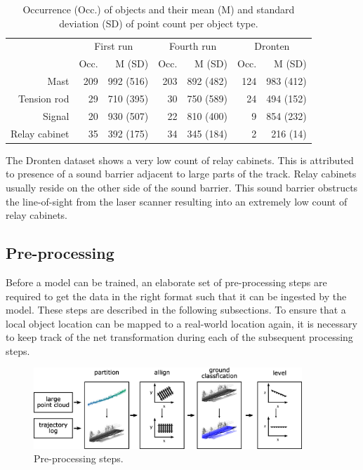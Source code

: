 \begin{table}[ht]
    \centering
    \begin{tabular}{rrrrrrr}
        \toprule
        & \multicolumn{2}{c}{First run} & \multicolumn{2}{c}{Fourth run} & \multicolumn{2}{c}{Dronten}\\
        & Occ. & M (SD) & Occ. & M (SD) & Occ. & M (SD)\\
        \midrule
        Mast &          209 & 992 (516) & 203 & 892 (482) & 124 & 983 (412)\\
        Tension rod &    29 & 710 (395) &  30 & 750 (589) &  24 & 494 (152)\\
        Signal &         20 & 930 (507) &  22 & 810 (400) &   9 & 854 (232)\\
        Relay cabinet &  35 & 392 (175) &  34 & 345 (184) &   2 & 216 (14)\\
        \bottomrule
    \end{tabular}
    \caption{Occurrence (Occ.) of objects and their mean (M) and standard deviation (SD) of point count per object type.}
    \label{tbl:objdet:stats}
\end{table}

The Dronten dataset shows a very low count of relay cabinets. This is attributed to presence of a sound barrier adjacent to large parts of the track. Relay cabinets usually reside on the other side of the sound barrier. This sound barrier obstructs the line-of-sight from the laser scanner resulting into an extremely low count of relay cabinets.

\subsection{Pre-processing}
Before a model can be trained, an elaborate set of pre-processing steps are required to get the data in the right format such that it can be ingested by the model. These steps are described in the following subsections. To ensure that a local object location can be mapped to a real-world location again, it is necessary to keep track of the net transformation during each of the subsequent processing steps.

\begin{figure}[ht]
    \includegraphics[width=0.9\textwidth]{Chapters/objdet/figures/processing.png}
    \caption{Pre-processing steps.}
    \label{fig:objdet:processing}
\end{figure}

